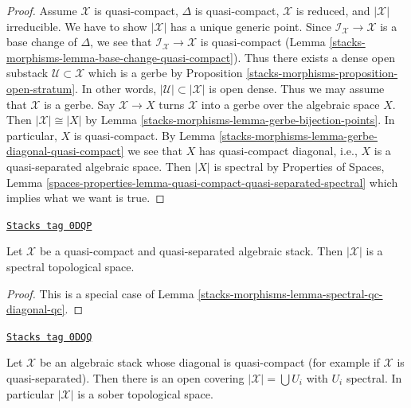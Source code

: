 \begin{proof}
\medskip\noindent
Assume $\mathcal{X}$ is quasi-compact, $\Delta$ is quasi-compact,
$\mathcal{X}$ is reduced, and $|\mathcal{X}|$ irreducible.
We have to show $|\mathcal{X}|$ has a unique generic point.
Since $\mathcal{I}_\mathcal{X} \to \mathcal{X}$ is a base change of $\Delta$,
we see that $\mathcal{I}_\mathcal{X} \to \mathcal{X}$
is quasi-compact (Lemma \ref{stacks-morphisms-lemma-base-change-quasi-compact}).
Thus there exists a dense open substack $\mathcal{U} \subset \mathcal{X}$
which is a gerbe by
Proposition \ref{stacks-morphisms-proposition-open-stratum}.
In other words, $|\mathcal{U}| \subset |\mathcal{X}|$
is open dense. Thus we may assume that $\mathcal{X}$ is a gerbe.
Say $\mathcal{X} \to X$ turns $\mathcal{X}$ into a gerbe over the
algebraic space $X$. Then $|\mathcal{X}| \cong |X|$ by
Lemma \ref{stacks-morphisms-lemma-gerbe-bijection-points}.
In particular, $X$ is quasi-compact.
By Lemma \ref{stacks-morphisms-lemma-gerbe-diagonal-quasi-compact}
we see that $X$ has quasi-compact diagonal,
i.e., $X$ is a quasi-separated algebraic space.
Then $|X|$ is spectral by
Properties of Spaces, Lemma
\ref{spaces-properties-lemma-quasi-compact-quasi-separated-spectral}
which implies what we want is true.
\end{proof}

\begin{lemma}
\label{stacks-morphisms-lemma-spectral-qcqs}
\href{https://stacks.math.columbia.edu/tag/0DQP}{\texttt{Stacks tag 0DQP}}

Let $\mathcal{X}$ be a quasi-compact and quasi-separated algebraic stack.
Then $|\mathcal{X}|$ is a spectral topological space.
\end{lemma}

\begin{proof}
This is a special case of Lemma \ref{stacks-morphisms-lemma-spectral-qc-diagonal-qc}.
\end{proof}

\begin{lemma}[Sober qs]
\label{stacks-morphisms-lemma-sober-qs}
\href{https://stacks.math.columbia.edu/tag/0DQQ}{\texttt{Stacks tag 0DQQ}}

Let $\mathcal{X}$ be an algebraic stack whose diagonal is quasi-compact
(for example if $\mathcal{X}$ is quasi-separated).
Then there is an open covering $|\mathcal{X}| = \bigcup U_i$
with $U_i$ spectral. In particular $|\mathcal{X}|$ is
a sober topological space.
\end{lemma}

